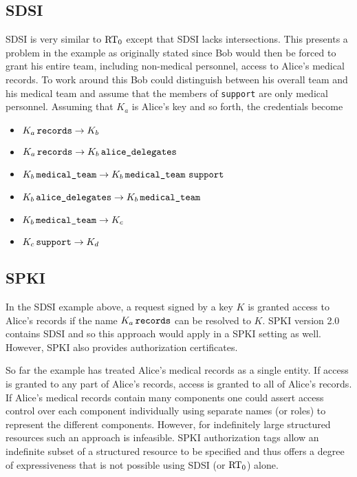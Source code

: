 \documentclass{article}
\begin{document}
\subsection{SDSI}

SDSI is very similar to $\text{RT}_0$ except that SDSI lacks intersections.
 This presents a problem in the example as originally stated since
Bob would then be forced to grant his entire team, including non-medical
personnel, access to Alice's medical records. To work around this Bob could
distinguish between his overall team and his medical team and assume that
the members of \texttt{support} are only medical personnel. Assuming that
$K_a$ is Alice's key and so forth, the credentials become

\begin{itemize}

\item $K_a\, \text{\tt records} \rightarrow K_b$
\item $K_a\, \text{\tt records} \rightarrow K_b\, \text{\tt alice\_delegates}$
\item $K_b\, \text{\tt medical\_team} \rightarrow K_b\, \text{\tt
  medical\_team}\,\, \text{\tt support}$
\item $K_b\, \text{\tt alice\_delegates} \rightarrow K_b\, \text{\tt
  medical\_team}$
\item $K_b\, \text{\tt medical\_team} \rightarrow K_c$
\item $K_c\, \text{\tt support} \rightarrow K_d$

\end{itemize}

\subsection{SPKI}

In the SDSI example above, a request signed by a key $K$ is granted access
to Alice's records if the name $K_a\, \text{\tt records}$ can be resolved
to $K$. SPKI version 2.0 contains SDSI and so this approach would apply in
a SPKI setting as well. However, SPKI also provides authorization
certificates.

So far the example has treated Alice's medical records as a single entity.
If access is granted to any part of Alice's records, access is granted to
all of Alice's records. If Alice's medical records contain many components
one could assert access control over each component individually using
separate names (or roles) to represent the different components. However,
for indefinitely large structured resources such an approach is infeasible.
SPKI authorization tags allow an indefinite subset of a structured resource
to be specified and thus offers a degree of expressiveness that is not
possible using SDSI (or $\text{RT}_0$) alone.
\end{document}
